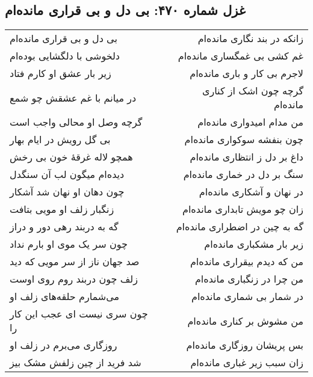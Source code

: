 \begin{center}
\section*{غزل شماره ۴۷۰: بی دل و بی قراری مانده‌ام}
\label{sec:470}
\begin{longtable}{l p{0.5cm} r}
بی دل و بی قراری مانده‌ام
&&
زانکه در بند نگاری مانده‌ام
\\
دلخوشی با دلگشایی بوده‌ام
&&
غم کشی بی غمگساری مانده‌ام
\\
زیر بار عشق او کارم فتاد
&&
لاجرم بی کار و باری مانده‌ام
\\
در میانم با غم عشقش چو شمع
&&
گرچه چون اشک از کناری مانده‌ام
\\
گرچه وصل او محالی واجب است
&&
من مدام امیدواری مانده‌ام
\\
بی گل رویش در ایام بهار
&&
چون بنفشه سوکواری مانده‌ام
\\
همچو لاله غرقهٔ خون بی رخش
&&
داغ بر دل ز انتظاری مانده‌ام
\\
دیده‌ام میگون لب آن سنگدل
&&
سنگ بر دل در خماری مانده‌ام
\\
چون دهان او نهان شد آشکار
&&
در نهان و آشکاری مانده‌ام
\\
زنگبار زلف او مویی بتافت
&&
زان چو مویش تابداری مانده‌ام
\\
گه به دربند رهی دور و دراز
&&
گه به چین در اضطراری مانده‌ام
\\
چون سر یک موی او بارم نداد
&&
زیر بار مشکباری مانده‌ام
\\
صد جهان ناز از سر مویی که دید
&&
من که دیدم بیقراری مانده‌ام
\\
زلف چون دربند روم روی اوست
&&
من چرا در زنگباری مانده‌ام
\\
می‌شمارم حلقه‌های زلف او
&&
در شمار بی شماری مانده‌ام
\\
چون سری نیست ای عجب این کار را
&&
من مشوش بر کناری مانده‌ام
\\
روزگاری می‌برم در زلف او
&&
بس پریشان روزگاری مانده‌ام
\\
شد فرید از چین زلفش مشک بیز
&&
زان سبب زیر غباری مانده‌ام
\\
\end{longtable}
\end{center}
